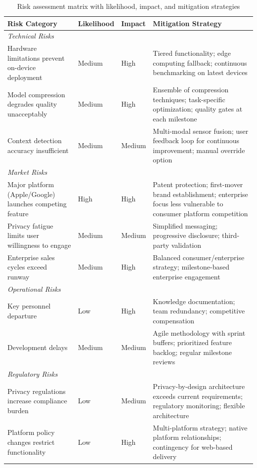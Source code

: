 \documentclass[11pt]{article}
\begin{document}
\begin{table}[h]
\centering
\small
\begin{tabular}{p{2.8cm}p{1.3cm}p{1.3cm}p{6.8cm}}
\toprule
\textbf{Risk Category} & \textbf{Likelihood} & \textbf{Impact} & \textbf{Mitigation Strategy} \\
\midrule
\multicolumn{4}{l}{\textit{Technical Risks}} \\
Hardware limitations prevent on-device deployment & Medium & High & Tiered functionality; edge computing fallback; continuous benchmarking on latest devices \\
Model compression degrades quality unacceptably & Medium & High & Ensemble of compression techniques; task-specific optimization; quality gates at each milestone \\
Context detection accuracy insufficient & Medium & Medium & Multi-modal sensor fusion; user feedback loop for continuous improvement; manual override option \\
\midrule
\multicolumn{4}{l}{\textit{Market Risks}} \\
Major platform (Apple/Google) launches competing feature & High & High & Patent protection; first-mover brand establishment; enterprise focus less vulnerable to consumer platform competition \\
Privacy fatigue limits user willingness to engage & Medium & Medium & Simplified messaging; progressive disclosure; third-party validation \\
Enterprise sales cycles exceed runway & Medium & High & Balanced consumer/enterprise strategy; milestone-based enterprise engagement \\
\midrule
\multicolumn{4}{l}{\textit{Operational Risks}} \\
Key personnel departure & Low & High & Knowledge documentation; team redundancy; competitive compensation \\
Development delays & Medium & Medium & Agile methodology with sprint buffers; prioritized feature backlog; regular milestone reviews \\
\midrule
\multicolumn{4}{l}{\textit{Regulatory Risks}} \\
Privacy regulations increase compliance burden & Low & Medium & Privacy-by-design architecture exceeds current requirements; regulatory monitoring; flexible architecture \\
Platform policy changes restrict functionality & Low & High & Multi-platform strategy; native platform relationships; contingency for web-based delivery \\
\bottomrule
\end{tabular}
\caption{Risk assessment matrix with likelihood, impact, and mitigation strategies}
\label{tab:risks}
\end{table}
\end{document}

